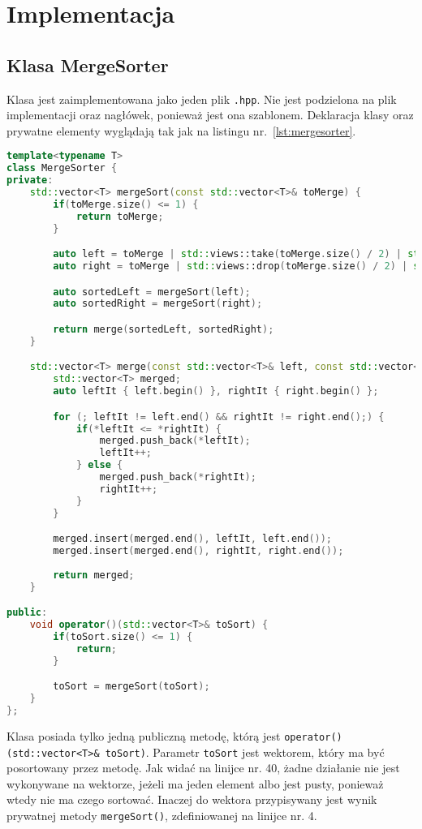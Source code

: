 	\newpage
\section{Implementacja}		%

\subsection{Klasa MergeSorter} \label{sec:MergeSorter}

Klasa jest zaimplementowana jako jeden plik \texttt{.hpp}. Nie jest podzielona na plik implementacji oraz nagłówek, ponieważ jest ona szablonem. Deklaracja klasy oraz prywatne elementy wyglądają tak jak na listingu nr.~\ref{lst:mergesorter}.

\begin{lstlisting}[caption=Klasa \texttt{MergeSorter}, label={lst:mergesorter}, language=C++]
template<typename T>
class MergeSorter {
private: 
	std::vector<T> mergeSort(const std::vector<T>& toMerge) {
		if(toMerge.size() <= 1) {
			return toMerge;
		}

		auto left = toMerge | std::views::take(toMerge.size() / 2) | std::ranges::to<std::vector>();
		auto right = toMerge | std::views::drop(toMerge.size() / 2) | std::ranges::to<std::vector>();

		auto sortedLeft = mergeSort(left);
		auto sortedRight = mergeSort(right);

		return merge(sortedLeft, sortedRight);
	}

	std::vector<T> merge(const std::vector<T>& left, const std::vector<T>& right) {
		std::vector<T> merged;
		auto leftIt { left.begin() }, rightIt { right.begin() };

		for (; leftIt != left.end() && rightIt != right.end();) {
			if(*leftIt <= *rightIt) {
				merged.push_back(*leftIt);
				leftIt++;
			} else {
				merged.push_back(*rightIt);
				rightIt++;
			}
		}

		merged.insert(merged.end(), leftIt, left.end());
		merged.insert(merged.end(), rightIt, right.end());
		
		return merged;
	}

public:
	void operator()(std::vector<T>& toSort) {
		if(toSort.size() <= 1) {
			return;
		}

		toSort = mergeSort(toSort);	
	}
};
\end{lstlisting}
  
Klasa posiada tylko jedną publiczną metodę, którą jest \texttt{operator()(std::vector<T>\& toSort)}. Parametr \texttt{toSort} jest wektorem, który ma być posortowany przez metodę. Jak widać na linijce nr. 40, żadne działanie nie jest wykonywane na wektorze, jeżeli ma jeden element albo jest pusty, ponieważ wtedy nie ma czego sortować. Inaczej do wektora przypisywany jest wynik prywatnej metody \texttt{mergeSort()}, zdefiniowanej na linijce nr. 4.

